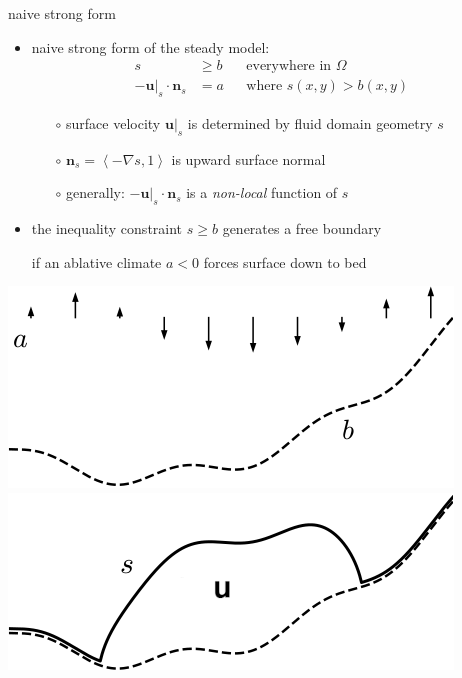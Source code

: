 \documentclass[svgnames,
               hyperref={colorlinks,citecolor=DeepPink4,linkcolor=FireBrick,urlcolor=Maroon},
               usepdftitle=false]  %
               {beamer}
\newcommand{\grad}{\nabla}
\newcommand{\bn}{\mathbf{n}}
\newcommand{\bu}{\mathbf{u}}
\begin{document}
\begin{frame}{naive strong form}

\begin{itemize}
\item naive strong form of the steady model: %
\begin{align*}
s &\ge b                    & &\text{everywhere in } \Omega \\
-\bu|_s \cdot \bn_s &= a    & &\text{where } s(x,y) > b(x,y)
\end{align*}

    \begin{itemize}
    \item[$\circ$] surface velocity $\bu|_s$ is determined by fluid domain geometry $s$
    \item[$\circ$] $\bn_s=\left<-\grad s,1\right>$ is upward surface normal
    \item[$\circ$] generally: $-\bu|_s \cdot \bn_s$ is a \emph{non-local} function of $s$
    \end{itemize}
\item the inequality constraint $s \ge b$ \alert{generates a free boundary}

if an ablative climate $a < 0$ forces surface down to bed
\end{itemize}

\bigskip
\hfill \mbox{\includegraphics[height=0.2\textheight]{../talk-oxford/images/domain-data.png} \hspace{7mm} \includegraphics[height=0.2\textheight]{../talk-oxford/images/domain-velocity.png}}
\end{frame}
\end{document}
